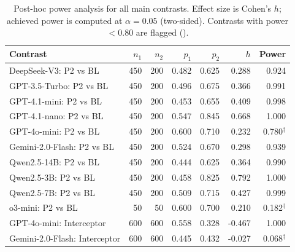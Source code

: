 \begin{table}[t]
\centering
\caption{Post-hoc power analysis for all main contrasts. Effect size is Cohen's $h$; achieved power is computed at $\alpha = 0.05$ (two-sided). Contrasts with power $< 0.80$ are flagged (\dag).}
\label{tab:power}
\small
\begin{tabular}{l r r r r r r}
\toprule
Contrast & $n_1$ & $n_2$ & $p_1$ & $p_2$ & $h$ & Power \\
\midrule
DeepSeek-V3: P2 vs BL & 450 & 200 & 0.482 & 0.625 & 0.288 & 0.924 \\
GPT-3.5-Turbo: P2 vs BL & 450 & 200 & 0.496 & 0.675 & 0.366 & 0.991 \\
GPT-4.1-mini: P2 vs BL & 450 & 200 & 0.453 & 0.655 & 0.409 & 0.998 \\
GPT-4.1-nano: P2 vs BL & 450 & 200 & 0.547 & 0.845 & 0.668 & 1.000 \\
GPT-4o-mini: P2 vs BL & 450 & 200 & 0.600 & 0.710 & 0.232 & 0.780$^{\dag}$ \\
Gemini-2.0-Flash: P2 vs BL & 450 & 200 & 0.524 & 0.670 & 0.298 & 0.939 \\
Qwen2.5-14B: P2 vs BL & 450 & 200 & 0.444 & 0.625 & 0.364 & 0.990 \\
Qwen2.5-3B: P2 vs BL & 450 & 200 & 0.458 & 0.825 & 0.792 & 1.000 \\
Qwen2.5-7B: P2 vs BL & 450 & 200 & 0.509 & 0.715 & 0.427 & 0.999 \\
o3-mini: P2 vs BL & 50 & 50 & 0.600 & 0.700 & 0.210 & 0.182$^{\dag}$ \\
GPT-4o-mini: Interceptor & 600 & 600 & 0.558 & 0.328 & -0.467 & 1.000 \\
Gemini-2.0-Flash: Interceptor & 600 & 600 & 0.445 & 0.432 & -0.027 & 0.068$^{\dag}$ \\
\bottomrule
\end{tabular}
\end{table}